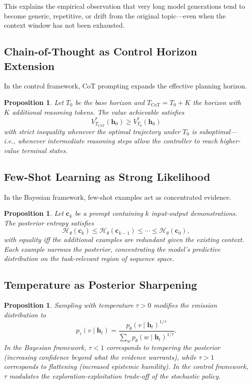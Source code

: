 \documentclass[11pt,a4paper]{article}
\theoremstyle{plain}
\newtheorem{proposition}[theorem]{Proposition}
\theoremstyle{definition}
\theoremstyle{remark}
\newcommand{\cH}{\mathcal{H}}
\begin{document}
This explains the empirical observation that very long model generations tend to
become generic, repetitive, or drift from the original topic---even when the
context window has not been exhausted.

\subsection{Chain-of-Thought as Control Horizon Extension}

In the control framework, CoT prompting expands the effective planning horizon.

\begin{proposition}
Let $T_0$ be the base horizon and $T_{\mathrm{CoT}} = T_0 + K$ the
horizon with $K$ additional reasoning tokens. The value achievable satisfies
\[
  V^*_{T_{\mathrm{CoT}}}(\bm{h}_0) \geq V^*_{T_0}(\bm{h}_0)
\]
with strict inequality whenever the optimal trajectory under $T_0$ is
suboptimal---i.e., whenever intermediate reasoning steps allow the controller
to reach higher-value terminal states.
\end{proposition}

\subsection{Few-Shot Learning as Strong Likelihood}

In the Bayesian framework, few-shot examples act as concentrated evidence.

\begin{proposition}
Let $\bm{c}_k$ be a prompt containing $k$ input-output demonstrations. The
posterior entropy satisfies
\[
  \cH_\theta(\bm{c}_k) \leq \cH_\theta(\bm{c}_{k-1}) \leq \cdots \leq
  \cH_\theta(\bm{c}_0),
\]
with equality iff the additional examples are redundant given the
existing context. Each example narrows the posterior, concentrating the
model's predictive distribution on the task-relevant region of sequence space.
\end{proposition}

\subsection{Temperature as Posterior Sharpening}

\begin{proposition}
Sampling with temperature $\tau > 0$ modifies the emission distribution to
\[
  p_\tau(v \mid \bm{h}_t)
  = \frac{p_\theta(v \mid \bm{h}_t)^{1/\tau}}%
         {\sum_{w} p_\theta(w \mid \bm{h}_t)^{1/\tau}}.
\]
In the Bayesian framework, $\tau < 1$ corresponds to \emph{tempering} the
posterior (increasing confidence beyond what the evidence warrants), while
$\tau > 1$ corresponds to \emph{flattening} (increased epistemic humility).
In the control framework, $\tau$ modulates the \emph{exploration-exploitation
trade-off} of the stochastic policy.
\end{proposition}
\end{document}
